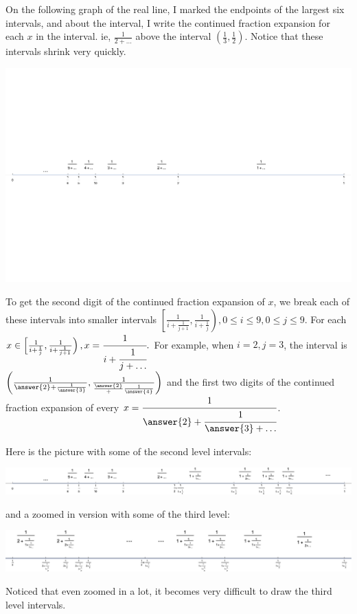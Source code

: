 \documentclass{ximera}
\begin{document}
On the following graph of the real line, I marked the endpoints of the largest six intervals, and about the interval, I write the continued fraction expansion for each $x$ in the interval. ie, $\frac{1}{2+\dots}$ above the interval $\left(\frac{1}{3},\frac{1}{2}\right)$. Notice that these intervals shrink very quickly.
\begin{image}
 \includegraphics[width=\textwidth]{cfcylinder}
\end{image}

To get the second digit of the continued fraction expansion of $x$, we break each of these intervals into smaller intervals $\left[\frac{1}{i+\frac{1}{j+1}},\frac{1}{i+\frac{1}{j}}\right), 0\leq i\leq 9,0\leq j\leq 9$. For each $x\in\left[\frac{1}{i+\frac{1}{j}},\frac{1}{i+\frac{1}{j+1}}\right), x=\cfrac{1}{i+\cfrac{1}{j+\dots}}.$ For example, when $i=2,j=3$, the interval is $\left(\frac{1}{\answer{2}+\frac{1}{\answer{3}}},\frac{1}{\frac{\answer{2}}+\frac{1}{\answer{4}}}\right)$ and the first two digits of the continued fraction expansion of every $x=\cfrac{1}{\answer{2}+\cfrac{1}{\answer{3}+\dots}}$.

Here is the picture with some of the second level intervals:
\begin{image}
 \includegraphics[width=\textwidth]{cfsecondlevel}
\end{image}
and a zoomed in version with some of the third level:
\begin{image}
 \includegraphics{cfthird}
\end{image}
Noticed that even zoomed in a lot, it becomes very difficult to draw the third level intervals. 
\end{document}
